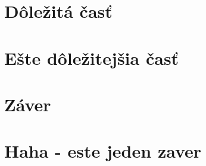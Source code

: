\documentclass[10pt,twocolumn,twoside,slovak,a4paper]{coursepaper}
\begin{document}
\section{Dôležitá časť} \label{dolezita}




\section{Ešte dôležitejšia časť} \label{dolezitejsia}




\section{Záver} \label{zaver} %

\section{Haha - este jeden zaver} \label{zaver2} 








\end{document}
